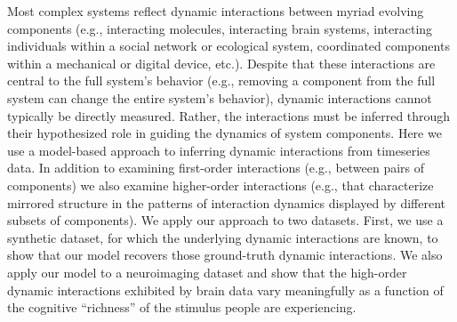 



  
  Most complex systems reflect dynamic interactions between myriad
  evolving components (e.g., interacting molecules, interacting brain
  systems, interacting individuals within a social network or
  ecological system, coordinated components within a mechanical or
  digital device, etc.).  Despite that these interactions are central
  to the full system's behavior (e.g., removing a component from the
  full system can change the entire system's behavior), dynamic
  interactions cannot typically be directly measured.  Rather, the
  interactions must be inferred through their hypothesized role in
  guiding the dynamics of system components.  Here we use a
  model-based approach to inferring dynamic interactions from
  timeseries data.  In addition to examining first-order interactions
  (e.g., between pairs of components) we also examine higher-order
  interactions (e.g., that characterize mirrored structure in the
  patterns of interaction dynamics displayed by different subsets of
  components).  We apply our approach to two datasets.  First, we use
  a synthetic dataset, for which the underlying dynamic interactions
  are known, to show that our model recovers those ground-truth
  dynamic interactions.  We also apply our model to a neuroimaging
  dataset and show that the high-order dynamic interactions exhibited
  by brain data vary meaningfully as a function of the cognitive
  ``richness'' of the stimulus people are experiencing.



